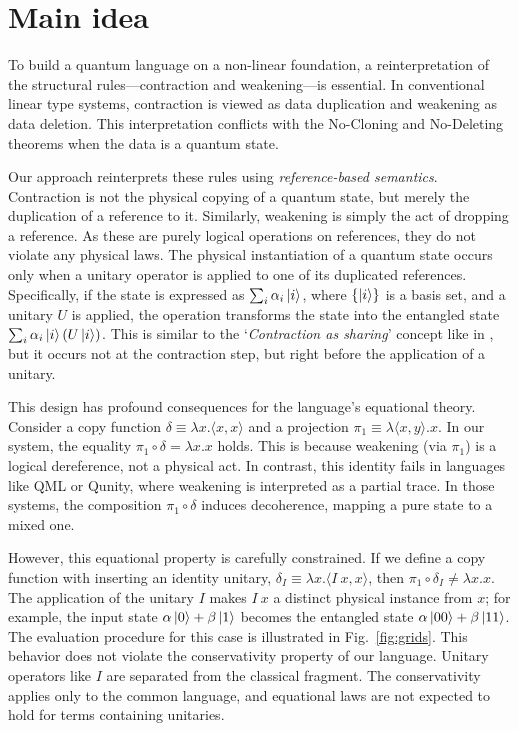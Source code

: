 
\section{Main idea} \label{sec:main-idea}
To build a quantum language on a non-linear foundation, a reinterpretation of the structural rules---contraction and weakening---is essential.
In conventional linear type systems, contraction is viewed as data duplication and weakening as data deletion.
This interpretation conflicts with the No-Cloning and No-Deleting theorems when the data is a quantum state.

Our approach reinterprets these rules using \textit{reference-based semantics}.
Contraction is not the physical copying of a quantum state, but merely the duplication of a reference to it.
Similarly, weakening is simply the act of dropping a reference.
As these are purely logical operations on references, they do not violate any physical laws.
The physical instantiation of a quantum state occurs only when a unitary operator is applied to one of its duplicated references.
Specifically, if the state is expressed as $\sum_i\alpha_i\ket{i}$, where $\{\ket{i}\}$ is a basis set, and a unitary $U$ is applied, the operation transforms the state into the entangled state $\sum_i\alpha_i\ket{i}(U\ket{i})$.
This is similar to the `\textit{Contraction as sharing}' concept like in \cite{ALTENKIRCH2005_FunctionalQuantumProgramming,ARRIGHI2004_OperationalSemanticsFormal}, but it occurs not at the contraction step, but right before the application of a unitary.

This design has profound consequences for the language's equational theory.
Consider a copy function $\delta \equiv \lambda x.\langle x,x\rangle$ and a projection $\pi_1 \equiv \lambda\langle x,y\rangle.x$. In our system, the equality $\pi_1\circ\delta=\lambda x. x$ holds.
This is because weakening (via $\pi_1$) is a logical dereference, not a physical act.
In contrast, this identity fails in languages like QML\cite{ALTENKIRCH2005_FunctionalQuantumProgramming} or Qunity\cite{VOICHICK2023_QunityUnifiedLanguage}, where weakening is interpreted as a partial trace.
In those systems, the composition $\pi_1\circ\delta$ induces decoherence, mapping a pure state to a mixed one.

However, this equational property is carefully constrained.
If we define a copy function with inserting an identity unitary, $\delta_I \equiv \lambda x.\langle I\ x,x\rangle$, then $\pi_1\circ\delta_I\ne\lambda x.x$.
The application of the unitary $I$ makes $I\ x$ a distinct physical instance from $x$; for example, the input state $\alpha\ket{0}+\beta\ket{1}$ becomes the entangled state $\alpha\ket{00}+\beta\ket{11}$.
The evaluation procedure for this case is illustrated in Fig.~\ref{fig:grids}.
This behavior does not violate the conservativity property of our language.
Unitary operators like $I$ are separated from the classical fragment.
The conservativity applies only to the common language, and equational laws are not expected to hold for terms containing unitaries.

